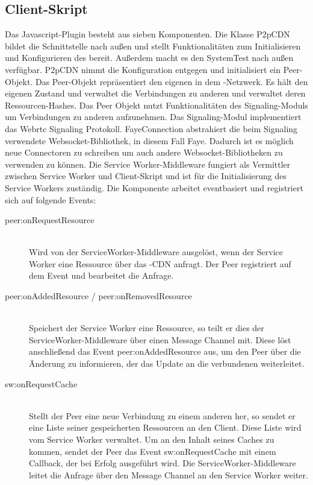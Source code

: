 \subsection{Client-Skript}

Das Javascript-Plugin besteht aus sieben Komponenten. Die Klasse P2pCDN bildet die Schnittstelle nach außen und stellt Funktionalitäten zum Initialisieren und Konfigurieren des \cdn bereit. Außerdem macht es den SystemTest nach außen verfügbar. P2pCDN nimmt die Konfiguration entgegen und initialisiert ein Peer-Objekt. Das Peer-Objekt repräsentiert den eigenen \client in dem \pTp-Netzwerk. Es hält den eigenen Zustand und verwaltet die Verbindungen zu anderen \clients und verwaltet deren Ressourcen-Hashes. Das Peer Objekt nutzt Funktionalitäten des Signaling-Moduls um Verbindungen zu anderen \clients aufzunehmen. Das Signaling-Modul implementiert das Webrtc Signaling Protokoll. FayeConnection abstrahiert die beim Signaling verwendete Websocket-Bibliothek, in diesem Fall Faye. Dadurch ist es möglich neue Connectoren zu schreiben um auch andere Websocket-Bibliotheken zu verwenden zu können.
Die Service Worker-Middleware fungiert als Vermittler zwischen Service Worker und Client-Skript und ist für die Initialisierung des Service Workers zuständig. Die Komponente arbeitet eventbasiert und registriert sich auf folgende Events:
\begin{description}
	\item[peer:onRequestResource]\hfill \\
	Wird von der ServiceWorker-Middleware ausgelöst, wenn der Service Worker eine Ressource über das \pTp-CDN anfragt. Der Peer registriert auf dem Event und bearbeitet die Anfrage.
	\item[peer:onAddedResource / peer:onRemovedResource]\hfill \\
	Speichert der Service Worker eine Ressource, so teilt er dies der ServiceWorker-Middleware über einen Message Channel mit. Diese löst anschließend das Event peer:onAddedResource aus, um den Peer über die Änderung zu informieren, der das Update an die verbundenen \clients weiterleitet.
	\item[sw:onRequestCache]\hfill \\
	Stellt der Peer eine neue Verbindung zu einem anderen \client her, so sendet er eine Liste seiner gespeicherten Ressourcen an den Client. Diese Liste wird vom Service Worker verwaltet. Um an den Inhalt seines Caches zu kommen, sendet der Peer das Event sw:onRequestCache mit einem Callback, der bei Erfolg ausgeführt wird. Die ServiceWorker-Middleware leitet die Anfrage über den Message Channel an den Service Worker weiter.
%	
\end{description}
%

